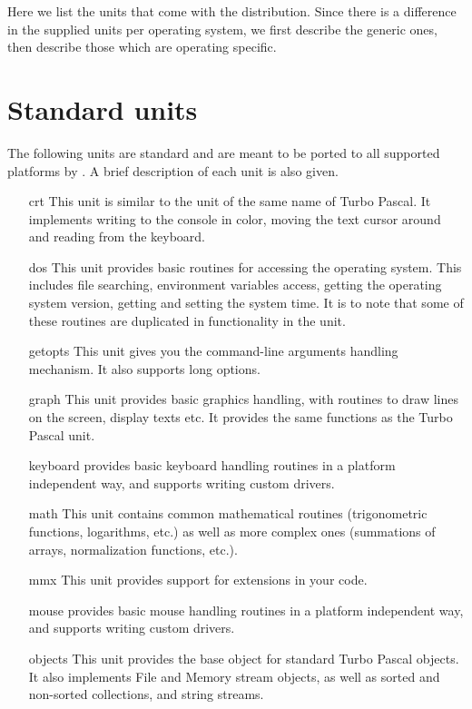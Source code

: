 Here we list the units that come with the \fpc distribution. Since there is
a difference in the supplied units per operating system, we first describe
the generic ones, then describe those which are operating specific. 

%
%
\section{Standard units}

The following units are standard and are meant to be ported to
all supported platforms by \fpc. A brief description of each unit
is also given.

\begin{itemize}
\item [crt] This unit is similar to the unit of the same name of
Turbo Pascal. It implements writing to the console in color,  moving the 
text cursor around and reading from the keyboard.
\item [dos] This unit provides basic routines for accessing the operating
system. This includes file searching, environment variables access,
getting the operating system version, getting and setting the
system time. It is to note that some of these routines are duplicated
in functionality in the  unit.
\item [getopts] This unit gives you the \gnu {} command-line
arguments  handling mechanism. It also supports long options.
\item [graph] This unit provides basic graphics handling, with routines to
draw lines on the screen, display texts etc. It provides the same functions
as the Turbo Pascal unit.
\item [keyboard] provides basic keyboard handling routines in a platform independent way,
and supports writing custom drivers.
\item[math] This unit contains common mathematical routines (trigonometric
functions, logarithms, etc.) as well as more complex ones (summations of arrays,
normalization functions, etc.).
\item [mmx] This unit provides support for  extensions in your
code. 
\item [mouse] provides basic mouse handling routines in a platform independent way,
and supports writing custom drivers. 
\item [objects]  This unit provides the base object for standard Turbo Pascal
objects. It also implements File and Memory stream objects, as well as sorted
and non-sorted collections, and string streams.

\end{itemize}
